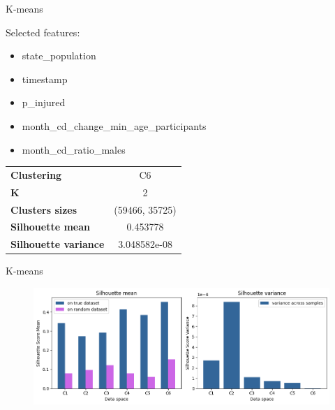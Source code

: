 
\begin{frame}{K-means}
    \begin{exampleblock}{Selected features:}
        \begin{itemize}
            \item state\_population
            \item timestamp
            \item p\_injured
            \item month\_cd\_change\_min\_age\_participants
            \item month\_cd\_ratio\_males
        \end{itemize}        
    \end{exampleblock}


    
    \begin{table}[]
        \centering
        \begin{tabular}{|lc|}
    
            \hline
            \textbf{Clustering}  & C6 \\
            \textbf{K} & 2\\
            \textbf{Clusters sizes} & (59466, 35725) \\
            \textbf{Silhouette mean} & 0.453778 \\
            \textbf{Silhouette variance} & 3.048582e-08 \\
            \hline

        \end{tabular}
        \label{tab:my_label}
    \end{table}
\end{frame}


\begin{frame}{K-means}
    \begin{figure}
        \centering
        \includegraphics[width=.99\textwidth]{img/clustering/kmeans.png}
        \label{kmeans}
    \end{figure}
\end{frame}


